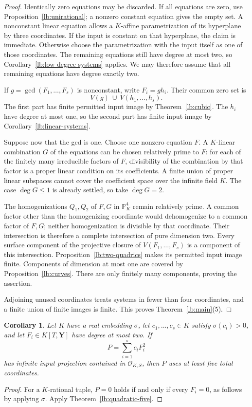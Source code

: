 \documentclass[11pt,a4paper]{article}
\newtheorem{corollary}[theorem]{Corollary}
\theoremstyle{definition}
\newcommand{\OKS}{\mathcal O_{K,S}}
\newcommand{\PP}{\mathbb P}
\begin{document}
\begin{proof}
Identically zero equations may be discarded. If all equations
are zero, use Proposition~\ref{lb:unirational}; a nonzero constant
equation gives the empty set. A nonconstant linear equation
allows a $K$-affine parametrization of its hyperplane by three
coordinates. If the input is constant on that hyperplane, the
claim is immediate. Otherwise choose the parametrization with
the input itself as one of those coordinates. The remaining
equations still have degree at most two, so
Corollary~\ref{lb:low-degree-systems} applies. We may therefore
assume that all remaining equations have degree exactly two.

If $g=\gcd(F_1,\ldots,F_s)$ is nonconstant, write $F_i=gh_i$.
Their common zero set is
\[
       V(g)\ \cup\ V(h_1,\ldots,h_s).
\]
The first part has finite permitted input image by
Theorem~\ref{lb:cubic}. The $h_i$ have degree at most one,
so the second part has finite input image by
Corollary~\ref{lb:linear-systems}.

Suppose now that the gcd is one. Choose one nonzero equation
$F$. A $K$-linear combination $G$ of the equations can be
chosen relatively prime to $F$: for each of the finitely many
irreducible factors of $F$, divisibility of the combination
by that factor is a proper linear condition on its coefficients.
A finite union of proper linear subspaces cannot cover the
coefficient space over the infinite field $K$. The case
$\deg G\le1$ is already settled, so take $\deg G=2$.

The homogenizations $Q_1,Q_2$ of $F,G$ in $\PP^4_K$ remain
relatively prime. A common factor other than the homogenizing
coordinate would dehomogenize to a common factor of $F,G$;
neither homogenization is divisible by that coordinate.
Their intersection is therefore a complete intersection of
pure dimension two. Every surface component of the projective
closure of $V(F_1,\ldots,F_s)$ is a component of this
intersection. Proposition~\ref{lb:two-quadrics} makes its
permitted input image finite. Components of dimension at most
one are covered by Proposition~\ref{lb:curves}. There are
only finitely many components, proving the assertion.

Adjoining unused coordinates treats systems in fewer than four
coordinates, and a finite union of finite images is finite.
This proves Theorem~\ref{lb:main}(5).
\end{proof}

\begin{corollary}\label{lb:quartic-sos}
Let $K$ have a real embedding $\sigma$, let $c_1,\ldots,c_s\in K$
satisfy $\sigma(c_i)>0$, and let $F_i\in K[T,\mathbf Y]$ have
degree at most two. If
\[
                  P=\sum_{i=1}^s c_iF_i^2
\]
has infinite input projection contained in $\OKS$, then $P$
uses at least five total coordinates.
\end{corollary}
\begin{proof}
For a $K$-rational tuple, $P=0$ holds if and only if every
$F_i=0$, as follows by applying $\sigma$. Apply
Theorem~\ref{lb:quadratic-five}.
\end{proof}
\end{document}
